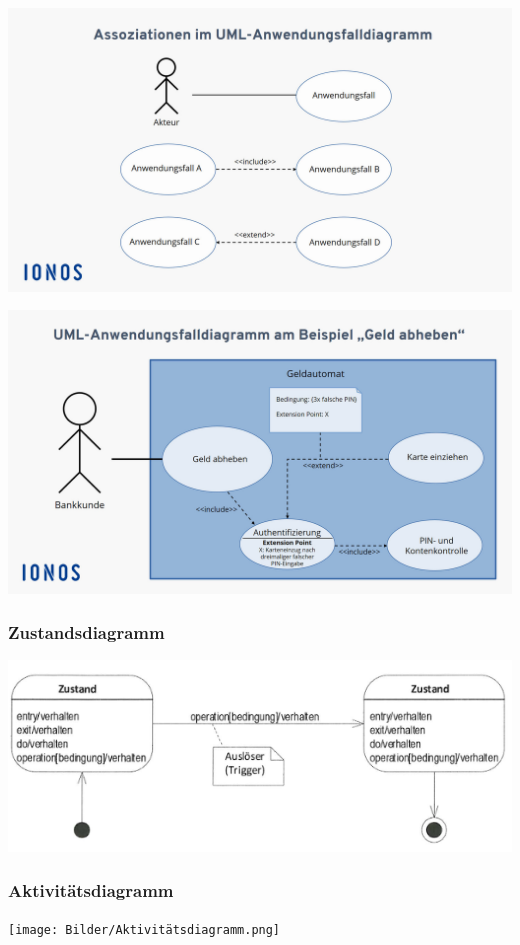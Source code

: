 \begin{center}
	\includegraphics[scale=.25]{Bilder/UseCaseDiagram.png}
	
	\includegraphics[scale=.25]{Bilder/UseCaseDiagramBeispiel.png}
\end{center}

\subsubsection{Zustandsdiagramm}
\label{sec:Zustandsdiagramm}

\begin{center}
	\includegraphics[scale=.9]{Bilder/Zustandsdiagramm.png}
\end{center}

\subsubsection{Aktivitätsdiagramm}
\label{sec:Aktivitaetsdiagramm}

\begin{center}
	\texttt{[image: Bilder/Aktivitätsdiagramm.png]}
\end{center}

